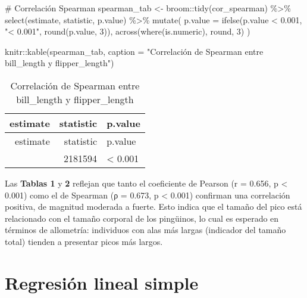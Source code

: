 \documentclass[
  spanish,
  11pt,
  a4paper,
  DIV=11,
  numbers=noendperiod]{scrartcl}
\newenvironment{Shaded}{\begin{snugshade}}{\end{snugshade}}
\newcommand{\AttributeTok}[1]{\textcolor[rgb]{0.40,0.45,0.13}{#1}}
\newcommand{\CommentTok}[1]{\textcolor[rgb]{0.37,0.37,0.37}{#1}}
\newcommand{\DecValTok}[1]{\textcolor[rgb]{0.68,0.00,0.00}{#1}}
\newcommand{\FloatTok}[1]{\textcolor[rgb]{0.68,0.00,0.00}{#1}}
\newcommand{\FunctionTok}[1]{\textcolor[rgb]{0.28,0.35,0.67}{#1}}
\newcommand{\NormalTok}[1]{\textcolor[rgb]{0.00,0.23,0.31}{#1}}
\newcommand{\OtherTok}[1]{\textcolor[rgb]{0.00,0.23,0.31}{#1}}
\newcommand{\SpecialCharTok}[1]{\textcolor[rgb]{0.37,0.37,0.37}{#1}}
\newcommand{\StringTok}[1]{\textcolor[rgb]{0.13,0.47,0.30}{#1}}
\begin{document}
\begin{Shaded}
\begin{Highlighting}[numbers=left,,]
\CommentTok{\# Correlación Spearman}
\NormalTok{spearman\_tab }\OtherTok{\textless{}{-}}\NormalTok{ broom}\SpecialCharTok{::}\FunctionTok{tidy}\NormalTok{(cor\_spearman) }\SpecialCharTok{\%\textgreater{}\%}
  \FunctionTok{select}\NormalTok{(estimate, statistic, p.value) }\SpecialCharTok{\%\textgreater{}\%}
  \FunctionTok{mutate}\NormalTok{(}
    \AttributeTok{p.value =} \FunctionTok{ifelse}\NormalTok{(p.value }\SpecialCharTok{\textless{}} \FloatTok{0.001}\NormalTok{, }\StringTok{"\textless{} 0.001"}\NormalTok{, }\FunctionTok{round}\NormalTok{(p.value, }\DecValTok{3}\NormalTok{)),}
    \FunctionTok{across}\NormalTok{(}\FunctionTok{where}\NormalTok{(is.numeric), round, }\DecValTok{3}\NormalTok{)}
\NormalTok{  )}

\NormalTok{knitr}\SpecialCharTok{::}\FunctionTok{kable}\NormalTok{(spearman\_tab, }\AttributeTok{caption =} \StringTok{"Correlación de Spearman }
\StringTok{             entre bill\_length y flipper\_length"}\NormalTok{)}
\end{Highlighting}
\end{Shaded}

\begin{longtable}[]{@{}rrl@{}}
\caption{Correlación de Spearman entre bill\_length y
flipper\_length}\tabularnewline
\toprule\noalign{}
estimate & statistic & p.value \\
\midrule\noalign{}
\endfirsthead
\toprule\noalign{}
estimate & statistic & p.value \\
\midrule\noalign{}
\endhead
\bottomrule\noalign{}
\endlastfoot
0.673 & 2181594 & \textless{} 0.001 \\
\end{longtable}

Las \textbf{Tablas 1} y \textbf{2} reflejan que tanto el coeficiente de
Pearson (r = 0.656, p \textless{} 0.001) como el de Spearman (ρ = 0.673,
p \textless{} 0.001) confirman una correlación positiva, de magnitud
moderada a fuerte. Esto indica que el tamaño del pico está relacionado
con el tamaño corporal de los pingüinos, lo cual es esperado en términos
de allometría: individuos con alas más largas (indicador del tamaño
total) tienden a presentar picos más largos.

\section{Regresión lineal simple}\label{regresiuxf3n-lineal-simple}
\end{document}
